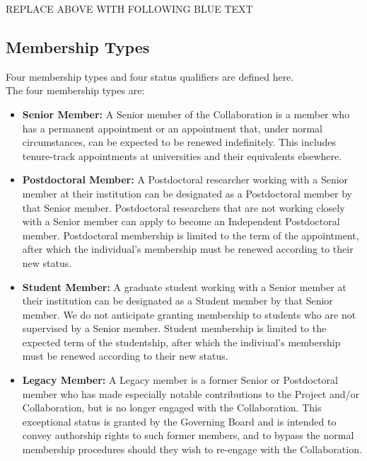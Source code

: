 \documentclass[12pt]{article}
\begin{document}
{{\begin{itemize}
\end{itemize}

}


\newpage

\noindent REPLACE ABOVE WITH FOLLOWING BLUE TEXT

\subsection{Membership Types}
\label{sec:memtypes}

Four membership types and four status qualifiers are defined here. \\

\noindent The four membership types are:
\begin{itemize}

\item {\bf Senior Member:} 
A Senior member of the Collaboration is a member who has a permanent appointment or an appointment that, under normal circumstances, can be expected to be renewed indefinitely.  This includes tenure-track appointments at universities and their equivalents elsewhere.  

\item {\bf Postdoctoral Member:} 
A Postdoctoral researcher working with a Senior member at their institution can be designated as a Postdoctoral member by that Senior member. Postdoctoral researchers that are not working closely with a Senior member can apply to become an Independent Postdoctoral member. Postdoctoral membership is limited to the term of the appointment, after which the individual's membership must be renewed according to their new status.

\item {\bf Student Member:} 
A graduate student working with a Senior member at their institution can be designated as a Student member by that Senior member.  We do not anticipate granting membership to students who are not supervised by a Senior member. Student membership is limited to the expected term of the studentship, after which the indiviual's membership must be renewed according to their new status.

\item {\bf Legacy Member:}  
A Legacy member is a former Senior or Postdoctoral member who has made especially notable contributions to the Project and/or Collaboration, but is no longer engaged with the Collaboration. This exceptional status is granted by the Governing Board and is intended to convey authorship rights to such former members, and to bypass the normal membership procedures should they wish to re-engage with the Collaboration.


\end{itemize}}
\end{document}

